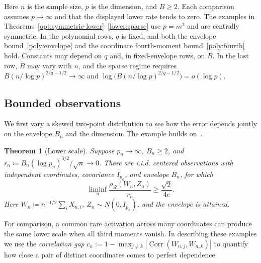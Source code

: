 \documentclass[11pt,letterpaper]{article}
\newtheorem{theorem}{Theorem}
\theoremstyle{remark}
\newcommand{\rh}{\rho_{\mathcal R}}
\begin{document}
\begin{table}[!htb]
\begin{tabular*}{\linewidth}{@{\extracolsep{\fill}}lcc@{}}
\bottomrule
\end{tabular*}
\par\medskip
\begin{minipage}{\linewidth}\small
Here \(n\) is the sample size, \(p\) is the dimension, and \(B\ge2\).
Each comparison assumes \(p\to\infty\) and that the displayed lower rate
tends to zero. The examples in Theorems~\ref{opt:symmetric-lower}--\ref{lower:sparse}
use \(p=m^2\) and are centrally symmetric. In the polynomial rows, \(q\) is
fixed, and both the envelope bound~\eqref{poly:envelope} and the coordinate
fourth-moment bound~\eqref{poly:fourth} hold. Constants may depend on \(q\)
and, in fixed-envelope rows, on \(B\). In the last row, \(B\) may vary with
\(n\), and the sparse regime requires
\(B(n/\log p)^{2/q-1/2}\to\infty\) and
\(\log\!\bigl(B(n/\log p)^{2/q-1/2}\bigr)=o(\log p)\).
\end{minipage}
\end{table}

\subsection{Bounded observations}
We first vary a skewed two-point distribution to see how the error
depends jointly on the envelope \(B_n\) and the dimension. The
example builds on~\cite[Proposition~2.1]{CCK}.

\begin{theorem}[Lower scale]\label{opt:skew-lower}
Suppose \(p_n\to\infty\), \(B_n\ge2\), and
\(r_n\coloneqq B_n(\log p_n)^{3/2}/\sqrt n\to0\). There are i.i.d.
centered observations with independent coordinates, covariance
\(I_{p_n}\), and envelope \(B_n\), for which
\begin{equation}
 \liminf_n\frac{\rh(W_n,Z_n)}{r_n}\ge\frac{\sqrt2}{4e}.
 \label{opt:lower-constant}
\end{equation}
Here \(W_n\coloneqq n^{-1/2}\sum_iX_{n,i}\),
\(Z_n\sim N(0,I_{p_n})\), and the envelope is attained.
\end{theorem}

For comparison, a common rare activation across many coordinates can
produce the same lower scale when all third moments vanish.
In describing these examples we use the \emph{correlation gap}
\(c_n:=1-\max_{j\ne k}|\operatorname{Corr}(W_{n,j},W_{n,k})|\)
to quantify how close a pair of distinct coordinates comes to perfect
dependence.
\end{document}

